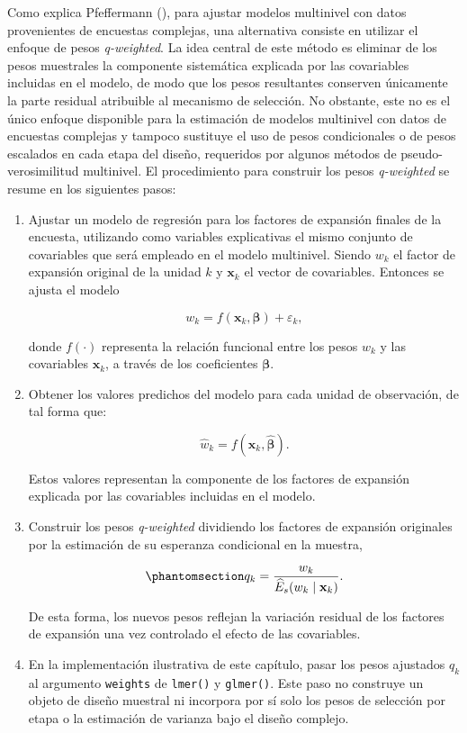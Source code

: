 \documentclass[
  spanish,
  11pt,
  letterpaper,
  oneside,
  open=any]{scrbook}
\begin{document}
Como explica Pfeffermann
(), para ajustar modelos
multinivel con datos provenientes de encuestas complejas, una
alternativa consiste en utilizar el enfoque de pesos \emph{q-weighted}.
La idea central de este método es eliminar de los pesos muestrales la
componente sistemática explicada por las covariables incluidas en el
modelo, de modo que los pesos resultantes conserven únicamente la parte
residual atribuible al mecanismo de selección. No obstante, este no es
el único enfoque disponible para la estimación de modelos multinivel con
datos de encuestas complejas y tampoco sustituye el uso de pesos
condicionales o de pesos escalados en cada etapa del diseño, requeridos
por algunos métodos de pseudo-verosimilitud multinivel. El procedimiento
para construir los pesos \emph{q-weighted} se resume en los siguientes
pasos:

\begin{enumerate}
\def\labelenumi{\arabic{enumi}.}
\item
  Ajustar un modelo de regresión para los factores de expansión finales
  de la encuesta, utilizando como variables explicativas el mismo
  conjunto de covariables que será empleado en el modelo multinivel.
  Siendo \(w_k\) el factor de expansión original de la unidad \(k\) y
  \(\mathbf{x}_k\) el vector de covariables. Entonces se ajusta el
  modelo

  \[
  w_k = f(\mathbf{x}_k, \boldsymbol{\beta}) + \varepsilon_k,
  \]

  donde \(f(\cdot)\) representa la relación funcional entre los pesos
  \(w_k\) y las covariables \(\mathbf{x}_k\), a través de los
  coeficientes \(\boldsymbol{\beta}\).
\item
  Obtener los valores predichos del modelo para cada unidad de
  observación, de tal forma que:

  \[
  \hat{w}_k = f(\mathbf{x}_k, \hat{\boldsymbol{\beta}}).
  \]

  Estos valores representan la componente de los factores de expansión
  explicada por las covariables incluidas en el modelo.
\item
  Construir los pesos \emph{q-weighted} dividiendo los factores de
  expansión originales por la estimación de su esperanza condicional en
  la muestra,

  \begin{equation}\protect\phantomsection\label{eq-pesos-q}{
  q_k = \frac{w_k}{\widehat{E}_s(w_k\mid\mathbf{x}_k)}.
  }\end{equation}

  De esta forma, los nuevos pesos reflejan la variación residual de los
  factores de expansión una vez controlado el efecto de las covariables.
\item
  En la implementación ilustrativa de este capítulo, pasar los pesos
  ajustados \(q_k\) al argumento \texttt{weights} de \texttt{lmer()} y
  \texttt{glmer()}. Este paso no construye un objeto de diseño muestral
  ni incorpora por sí solo los pesos de selección por etapa o la
  estimación de varianza bajo el diseño complejo.
\end{enumerate}
\end{document}
